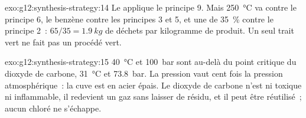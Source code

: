 \begin{solution}{exo:g12:synthesis-strategy:14}
Le  applique le principe 9. Mais \qty{250}{\celsius} va
contre le principe 6, le benzène contre les principes 3 et 5, et une
 de
\qty{35}{\percent} contre le principe 2~: $65/35 = \qty{1.9}{kg}$ de
déchets par kilogramme de produit. Un seul trait vert ne fait pas un
procédé vert.
\end{solution}

\begin{solution}{exo:g12:synthesis-strategy:15}
\qty{40}{\celsius} et \qty{100}{bar} sont au-delà du point critique du
dioxyde de carbone, \qty{31}{\celsius} et \qty{73.8}{bar}. La pression
vaut cent fois la pression atmosphérique~: la cuve est en acier épais.
Le dioxyde de carbone n'est ni toxique ni inflammable, il redevient un
gaz sans laisser de résidu, et il peut être réutilisé~; aucun 
chloré ne s'échappe.
\end{solution}

